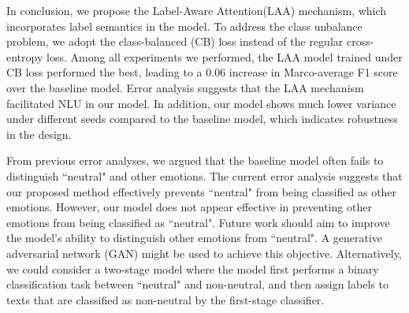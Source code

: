 

In conclusion, we propose the Label-Aware Attention(LAA) mechanism, which incorporates label semantics in the model. To address the class unbalance problem, we adopt the class-balanced (CB) loss instead of the regular cross-entropy loss. Among all experiments we performed, the LAA model trained under CB loss performed the best, leading to a 0.06 increase in Marco-average F1 score over the baseline model. Error analysis suggests that the LAA mechanism facilitated NLU in our model. In addition, our model shows much lower variance under different seeds compared to the baseline model, which indicates robustness in the design.


From previous error analyses, we argued that the baseline model often fails to distinguish ``neutral" and other emotions. The current error analysis suggests that our proposed method effectively prevents ``neutral" from being classified as other emotions. However, our model does not appear effective in preventing other emotions from being classified as ``neutral". Future work should aim to improve the model's ability to distinguish other emotions from ``neutral". A generative adversarial network (GAN) might be used to achieve this objective. Alternatively, we could consider a two-stage model where the model first performs a binary classification task between ``neutral" and non-neutral, and then assign labels to texts that are classified as non-neutral by the first-stage classifier. 



